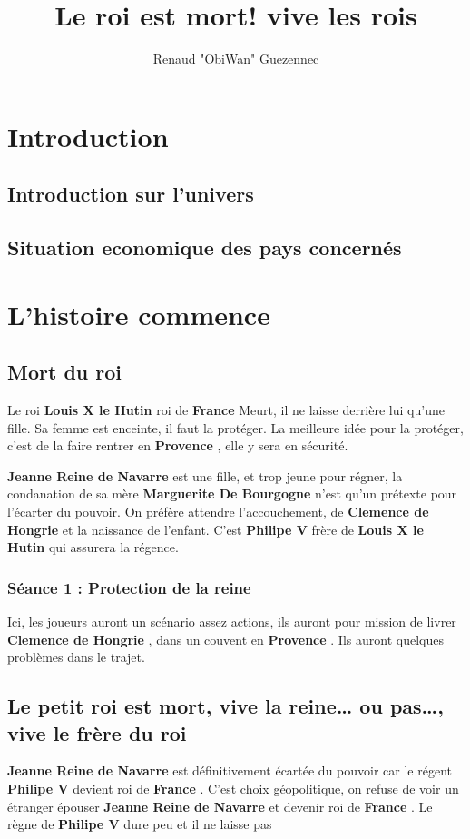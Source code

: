 \documentclass[oneside,12pt]{book}
\title{Le roi est mort! vive les rois}
\author{Renaud "ObiWan" Guezennec}
\date{}
\newcommand{\France}{\textbf{France} }
\newcommand{\Provence}{\textbf{Provence} }
\newcommand{\LouisX}{\textbf{Louis X le Hutin} }%
\newcommand{\MargueriteB}{\textbf{Marguerite De Bourgogne} }%
\newcommand{\Clemence}{\textbf{Clemence de Hongrie} }%
\newcommand{\PhilipeV}{\textbf{Philipe V} }%
\newcommand{\Jeanne}{\textbf{Jeanne Reine de Navarre} }%
\begin{document}
\maketitle \clearpage
\tableofcontents \clearpage

\begin{flushleft}
    \chapter{Introduction}
        \section{Introduction sur l'univers}

		\section{Situation economique des pays concernés}


\chapter{L'histoire commence}

\section{Mort du roi}
Le roi \LouisX roi de \France Meurt, il ne laisse derrière lui qu'une fille. Sa femme est enceinte, il faut la protéger. 
La meilleure idée pour la protéger, c'est de la faire rentrer en \Provence, elle y sera en sécurité.

\Jeanne est une fille, et trop jeune pour régner, la condanation de sa mère \MargueriteB n'est qu'un prétexte pour l'écarter du pouvoir. 
On préfère attendre l'accouchement, de \Clemence et la naissance de l'enfant. C'est \PhilipeV frère de \LouisX qui assurera la régence.



\subsection{Séance 1 : Protection de la reine}
Ici, les joueurs auront un scénario assez actions, ils auront pour mission de livrer \Clemence, dans un couvent en \Provence.
Ils auront quelques problèmes dans le trajet. 


\section{Le petit roi est mort, vive la reine… ou pas…, vive le frère du roi}
\Jeanne est définitivement écartée du pouvoir car le régent \PhilipeV devient roi de  \France.
C'est choix géopolitique, on refuse de voir un étranger épouser \Jeanne et devenir roi de \France.
Le règne de \PhilipeV dure peu et il ne laisse pas


\end{flushleft}
\end{document}
